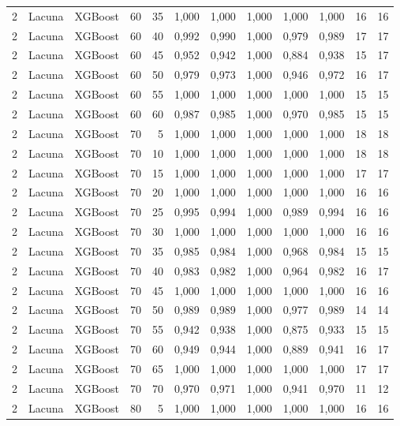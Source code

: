 \begin{longtable}{@{}rllrrrrrrrrr@{}}
2 & Lacuna & XGBoost & 60 & 35 & 1,000 & 1,000 & 1,000 & 1,000 & 1,000 & 16 & 16 \\
2 & Lacuna & XGBoost & 60 & 40 & 0,992 & 0,990 & 1,000 & 0,979 & 0,989 & 17 & 17 \\
2 & Lacuna & XGBoost & 60 & 45 & 0,952 & 0,942 & 1,000 & 0,884 & 0,938 & 15 & 17 \\
2 & Lacuna & XGBoost & 60 & 50 & 0,979 & 0,973 & 1,000 & 0,946 & 0,972 & 16 & 17 \\
2 & Lacuna & XGBoost & 60 & 55 & 1,000 & 1,000 & 1,000 & 1,000 & 1,000 & 15 & 15 \\
2 & Lacuna & XGBoost & 60 & 60 & 0,987 & 0,985 & 1,000 & 0,970 & 0,985 & 15 & 15 \\
2 & Lacuna & XGBoost & 70 & 5 & 1,000 & 1,000 & 1,000 & 1,000 & 1,000 & 18 & 18 \\
2 & Lacuna & XGBoost & 70 & 10 & 1,000 & 1,000 & 1,000 & 1,000 & 1,000 & 18 & 18 \\
2 & Lacuna & XGBoost & 70 & 15 & 1,000 & 1,000 & 1,000 & 1,000 & 1,000 & 17 & 17 \\
2 & Lacuna & XGBoost & 70 & 20 & 1,000 & 1,000 & 1,000 & 1,000 & 1,000 & 16 & 16 \\
2 & Lacuna & XGBoost & 70 & 25 & 0,995 & 0,994 & 1,000 & 0,989 & 0,994 & 16 & 16 \\
2 & Lacuna & XGBoost & 70 & 30 & 1,000 & 1,000 & 1,000 & 1,000 & 1,000 & 16 & 16 \\
2 & Lacuna & XGBoost & 70 & 35 & 0,985 & 0,984 & 1,000 & 0,968 & 0,984 & 15 & 15 \\
2 & Lacuna & XGBoost & 70 & 40 & 0,983 & 0,982 & 1,000 & 0,964 & 0,982 & 16 & 17 \\
2 & Lacuna & XGBoost & 70 & 45 & 1,000 & 1,000 & 1,000 & 1,000 & 1,000 & 16 & 16 \\
2 & Lacuna & XGBoost & 70 & 50 & 0,989 & 0,989 & 1,000 & 0,977 & 0,989 & 14 & 14 \\
2 & Lacuna & XGBoost & 70 & 55 & 0,942 & 0,938 & 1,000 & 0,875 & 0,933 & 15 & 15 \\
2 & Lacuna & XGBoost & 70 & 60 & 0,949 & 0,944 & 1,000 & 0,889 & 0,941 & 16 & 17 \\
2 & Lacuna & XGBoost & 70 & 65 & 1,000 & 1,000 & 1,000 & 1,000 & 1,000 & 17 & 17 \\
2 & Lacuna & XGBoost & 70 & 70 & 0,970 & 0,971 & 1,000 & 0,941 & 0,970 & 11 & 12 \\
2 & Lacuna & XGBoost & 80 & 5 & 1,000 & 1,000 & 1,000 & 1,000 & 1,000 & 16 & 16 \\

\end{longtable}
